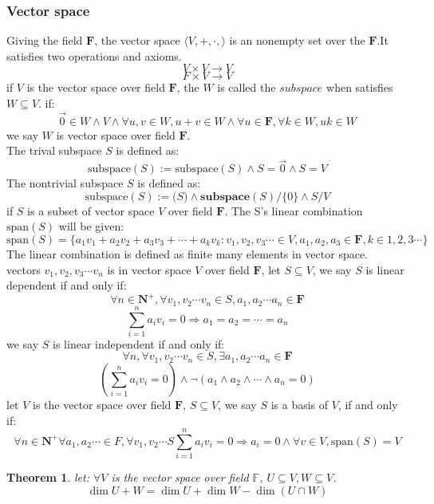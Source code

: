 \documentclass[10pt,a4paper]{article}
\newtheorem{theorem}{Theorem}[section]
\begin{document}
\subsubsection{Vector space}
Giving the field $\mathbf{F}$, the vector space $\langle V,+,\cdot,\rangle$ is an nonempty set over the $\mathbf{F}$.It satisfies two operations and axioms.
\[V\times V\to V\]
\[F\times V\to V\]
if $V$ is the vector space over field $\mathbf{F}$, the $W$ is called the $subspace$ when satisfies $W\subseteq V$.
if:
\[\vec{0}\in W\land V\land\forall u,v\in W,u+v\in W\land\forall u\in\mathbf{F},\forall k\in W,uk\in W\]
we say $W$ is vector space over field $\mathbf{F}$.\\
The trival subspace $S$ is defined as:
\[\mathrm{subspace}(S):=\mathrm{subspace}(S)\land S=\vec{0}\land S=V\]
The nontrivial subspace $S$ is defined as:
\[\mathrm{subspace}(S):=\mathrm(S)\land\mathbf{subspace}(S)/\{0\}\land S/V\]
if $S$ is a subset of vector space $V$ over field $\mathbf{F}$.
The S's linear combination $\mathrm{span}(S)$ will be given:
\[\mathrm{span}(S)=\{a_1v_1+a_2v_2+a_3v_3+\cdots+a_kv_k:v_1,v_2,v_3\cdots\in V,a_1,a_2,a_3\in\mathbf{F},k\in 1,2,3\cdots\}\]
The linear combination is defined as finite many elements in vector space.\\
vectors $v_1,v_2,v_3\cdots v_n$ is in vector space $V$ over field $\mathbf{F}$, let $S\subseteq V$,
we say $S$ is linear dependent if and only if:
\[\forall n\in\mathbf{N^+},\forall v_1,v_2\cdots v_n\in S,a_1,a_2\cdots a_n\in\mathbf{F}\]
\[\sum\limits_{i=1}^{n}a_iv_i=0\Rightarrow a_1=a_2=\cdots=a_n\]
we say $S$ is linear independent if and only if:
\[\forall n,\forall v_1,v_2\cdots v_n\in S,\exists a_1,a_2\cdots a_n\in\mathbf{F}\]
\[(\sum\limits_{i=1}^{n}a_iv_i=0)\land\neg(a_1\land a_2\land\cdots\land a_n=0)\]
let $V$ is the vector space over field $\mathbf{F}$, $S\subseteq V$, we say $S$ is a basis of $V$, if and only if:
\[\forall n\in\mathbf{N^+}\forall a_1,a_2\cdots\in F,\forall v_1,v_2\cdots S\sum\limits_{i=1}^{n}a_iv_i=0\Rightarrow a_i=0\land\forall v\in V,\mathrm{span}(S)=V\]
\begin{theorem}
    let: $\forall V$ is the vector space over field $\mathbb{F}$, $U\subseteq V,W\subseteq V$.
    \[\dim{U+W}=\dim{U}+\dim{W}-\dim(U\cap W)\]
\end{theorem}
\end{document}
